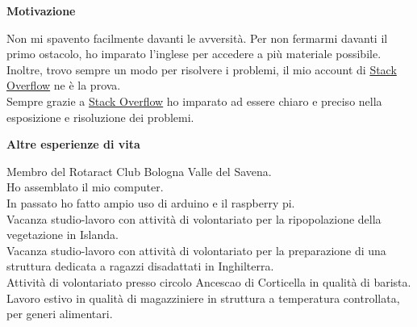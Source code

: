 \documentclass[a4paper,12pt,final]{memoir}
\newcommand{\Sep}{\vspace{1.5em}}
\newcommand{\SmallSep}{\vspace{0.5em}}
\newcommand{\CVSection}[1]
	{\Large\textbf{#1}\par
	\SmallSep\normalsize\normalfont}
\begin{document}
\CVSection{Motivazione}
	Non mi spavento facilmente davanti le avversità.
	Per non fermarmi davanti il primo ostacolo, ho imparato l'inglese per accedere a più materiale possibile.
	\\Inoltre, trovo sempre un modo per risolvere i problemi, il mio account di \href{https://stackoverflow.com/users/6875945/mattia-rubini}{Stack Overflow} ne è la prova.
	\\Sempre grazie a \href{https://stackoverflow.com/users/6875945/mattia-rubini}{Stack Overflow} ho imparato ad essere chiaro e preciso nella esposizione e risoluzione dei problemi.

\CVSection{Altre esperienze di vita}
	Membro del Rotaract Club Bologna Valle del Savena.
	\\Ho assemblato il mio computer.
	\\In passato ho fatto ampio uso di arduino e il raspberry pi.
	\\Vacanza studio-lavoro con attività di volontariato per la ripopolazione della vegetazione in Islanda.
	\\Vacanza studio-lavoro con attività di volontariato per la preparazione di una struttura dedicata a ragazzi disadattati in Inghilterra.
	\\Attività di volontariato presso circolo Ancescao di Corticella in qualità di barista.
	\\Lavoro estivo in qualità di magazziniere in struttura a temperatura controllata, per generi alimentari.
\Sep


\end{document}
